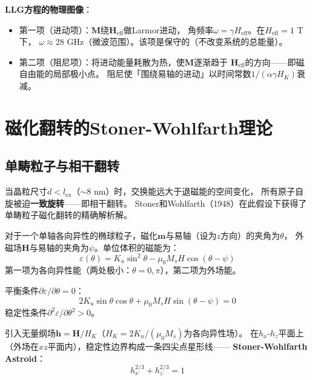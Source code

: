 \documentclass[11pt,a4paper,openany]{book}
\theoremstyle{definition}
\theoremstyle{plain}
\theoremstyle{remark}
\begin{document}
\textbf{LLG方程的物理图像}：
\begin{itemize}
  \item 第一项（进动项）：$\mathbf{M}$绕$\mathbf{H}_{\text{eff}}$做Larmor进动，
  角频率$\omega = \gamma H_{\text{eff}}$。在$H_{\text{eff}} = 1$ T下，
  $\omega \approx 28$ GHz（微波范围）。该项是保守的（不改变系统的总能量）。
  \item 第二项（阻尼项）：将进动能量耗散为热，使$\mathbf{M}$逐渐趋于
  $\mathbf{H}_{\text{eff}}$的方向——即磁自由能的局部极小点。
  阻尼使「围绕易轴的进动」以时间常数$1/(\alpha\gamma H_K)$衰减。
\end{itemize}

\section{磁化翻转的Stoner-Wohlfarth理论}

\subsection{单畴粒子与相干翻转}

当晶粒尺寸$d < l_{\text{ex}}$（$\sim 8$ nm）时，交换能远大于退磁能的空间变化，
所有原子自旋被迫\textbf{一致旋转}——即相干翻转。
Stoner和Wohlfarth（1948）在此假设下获得了单畴粒子磁化翻转的精确解析解。

对于一个单轴各向异性的椭球粒子，磁化$\mathbf{m}$与易轴（设为$z$方向）的夹角为$\theta$，
外磁场$\mathbf{H}$与易轴的夹角为$\psi$。单位体积的磁能为：
\begin{equation}\label{eq:sw-energy}
  \varepsilon(\theta) = K_u\sin^2\theta - \mu_0 M_s H\cos(\theta - \psi)
\end{equation}
第一项为各向异性能（两处极小：$\theta = 0, \pi$），第二项为外场能。

平衡条件$\partial\varepsilon/\partial\theta = 0$：
\begin{equation}\label{eq:sw-equilibrium}
  2K_u\sin\theta\cos\theta + \mu_0 M_s H\sin(\theta - \psi) = 0
\end{equation}
稳定性条件$\partial^2\varepsilon/\partial\theta^2 > 0$。

引入无量纲场$\mathbf{h} = \mathbf{H}/H_K$（$H_K = 2K_u/(\mu_0 M_s)$为各向异性场）。
在$h_x$-$h_z$平面上（外场在$xz$平面内），稳定性边界构成一条四尖点星形线——
\textbf{Stoner-Wohlfarth Astroid}：
\begin{equation}\label{eq:astroid}
  \boxed{ h_x^{2/3} + h_z^{2/3} = 1 }
\end{equation}
\end{document}
